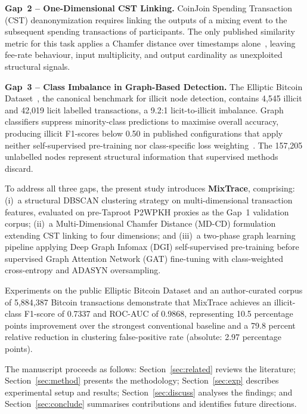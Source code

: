 \documentclass[12pt,a4paper]{article}
\begin{document}
\textbf{Gap~2 -- One-Dimensional CST Linking.}
CoinJoin Spending Transaction (CST) deanonymization requires
linking the outputs of a mixing event to the subsequent
spending transactions of participants. The only published
similarity metric for this task applies a Chamfer distance
over timestamps alone~\citep{chen2025multi}, leaving fee-rate
behaviour, input multiplicity, and output cardinality as
unexploited structural signals.

\textbf{Gap~3 -- Class Imbalance in Graph-Based Detection.}
The Elliptic Bitcoin Dataset~\citep{fan2024gnn}, the canonical
benchmark for illicit node detection, contains 4,545 illicit
and 42,019 licit labelled transactions, a 9.2:1
licit-to-illicit imbalance. Graph classifiers suppress
minority-class predictions to maximise overall accuracy,
producing illicit F1-scores below 0.50 in published
configurations that apply neither self-supervised pre-training
nor class-specific loss weighting~\citep{alarab2024}. The 157,205 unlabelled
nodes represent structural information that supervised
methods discard.

To address all three gaps, the present study introduces
\textbf{MixTrace}, comprising: (i)~a structural DBSCAN
clustering strategy on multi-dimensional transaction features,
evaluated on pre-Taproot P2WPKH proxies as the Gap~1
validation corpus;
(ii)~a Multi-Dimensional Chamfer Distance (MD-CD) formulation
extending CST linking to four dimensions; and (iii)~a
two-phase graph learning pipeline applying Deep Graph Infomax
(DGI) self-supervised pre-training before supervised Graph
Attention Network (GAT) fine-tuning with class-weighted
cross-entropy and ADASYN oversampling.

Experiments on the public Elliptic Bitcoin Dataset and an
author-curated corpus of 5,884,387 Bitcoin transactions
demonstrate that MixTrace achieves an illicit-class F1-score
of 0.7337 and ROC-AUC of 0.9868, representing 10.5 percentage
points improvement over the strongest conventional baseline
and a 79.8 percent relative reduction in clustering
false-positive rate (absolute: 2.97 percentage points).

The manuscript proceeds as follows: Section~\ref{sec:related}
reviews the literature; Section~\ref{sec:method} presents
the methodology; Section~\ref{sec:exp} describes experimental
setup and results; Section~\ref{sec:discuss} analyses the
findings; and Section~\ref{sec:conclude} summarises
contributions and identifies future directions.

\end{document}

